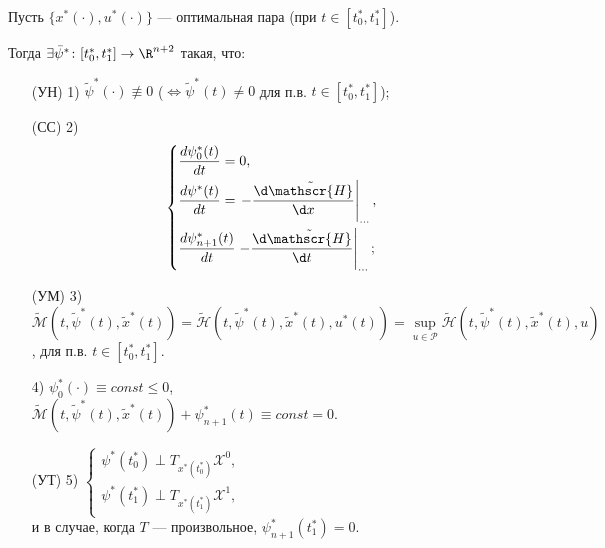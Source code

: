 \begin{theorem}
    Пусть $\{x^*(\cdot), u^*(\cdot)\}$ --- оптимальная пара (при $t \in [t_0^*, t_1^*]$).

    Тогда $\exists \bar{\psi}^* \colon [t_0^*, t_1^*] \to \R^{n+2}$ такая, что:
    \begin{enumerate}
        \item[(УН) 1)] $\tilde{\psi}^*(\cdot) \not\equiv 0$ ($\Leftrightarrow \tilde{\psi}^*(t) \neq 0$ для п.в. $t \in [t_0^*, t_1^*]$);
        \item[(СС) 2)]
        $$
        \left\{
            \begin{aligned}
                & \dfrac{d \psi_0^*(t)}{dt} = 0, \\
                & \dfrac{d \psi^*(t)}{dt} = \left. -\frac{\d \tilde{\mathscr{H}}}{\d x} \right|_{\ldots}, \\
                & \dfrac{d \psi_{n+1}^*(t)}{dt} \left. -\frac{\d \tilde{\mathscr{H}}}{\d t} \right|_{\ldots};
            \end{aligned}
        \right.
        $$
        \item[(УМ) 3)] $\tilde{\mathscr{M}}(t,\tilde{\psi}^*(t), \tilde{x}^*(t)) = \tilde{\mathscr{H}}(t,\tilde{\psi}^*(t), \tilde{x}^*(t), u^*(t)) = \sup\limits_{u \in \mathscr{P}} \tilde{\mathscr{H}}(t,\tilde{\psi}^*(t), \tilde{x}^*(t), u)$, для п.в. $t \in [t_0^*, t_1^*]$.
        \item[4)] $\psi_0^* (\cdot) \equiv const \leqslant 0$, \\
        $\tilde{\mathscr{M}}(t, \tilde{\psi}^*(t), \tilde{x}^*(t)) + \psi_{n+1}^*(t) \equiv const = 0$.
        \item[(УТ) 5)] $\left\{
            \begin{matrix}
                \psi^*(t_0^*) \perp T_{x^*(t_0^*)}\mathscr{X}^0, \\
                \psi^*(t_1^*) \perp T_{x^*(t_1^*)}\mathscr{X}^1,
            \end{matrix}
            \right.$\\
            и в случае, когда $T$ --- произвольное, $\psi_{n+1}^*(t_1^*) = 0$.
    \end{enumerate}
\end{theorem}
